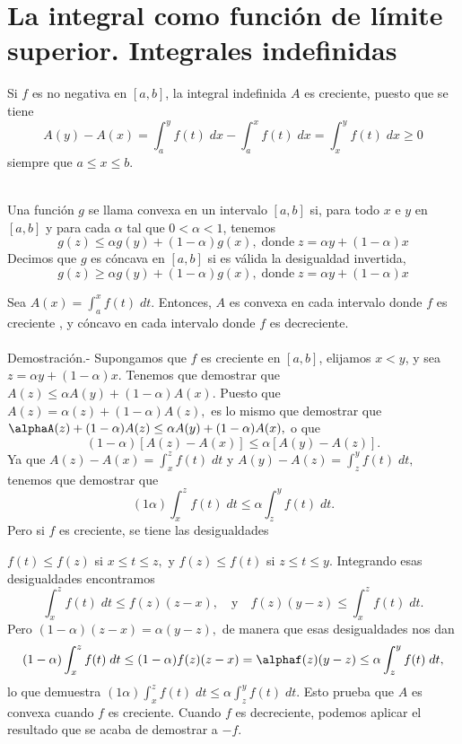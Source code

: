 \section{La integral como función de límite superior. Integrales indefinidas}

Si $f$ es no negativa en $[a,b]$, la integral indefinida $A$ es creciente, puesto que se tiene
$$A(y)-A(x)=\int_a^y f(t)\; dx - \int_a^x f(t)\; dx = \int_x^y f(t)\; dx \geq 0$$
siempre que $a\leq x \leq b.$\\\\

    \begin{def.} Una función $g$ se llama convexa en un intervalo $[a,b]$ si, para todo $x$ e $y$ en $[a,b]$ y para cada $\alpha$ tal que $0<\alpha<1$, tenemos 
	$$g(z)\leq \alpha g(y) + (1-\alpha)g(x),\; \mbox{donde}\; z=\alpha y + (1-\alpha)x$$
	Decimos que $g$ es cóncava en $[a,b]$ si es válida la desigualdad invertida,
	$$g(z)\geq \alpha g(y) + (1-\alpha)g(x),\; \mbox{donde}\; z=\alpha y + (1-\alpha)x$$
    \end{def.}

\begin{teo}
    Sea $A(x) =\int_a^x f(t)\; dt$. Entonces, $A$ es convexa en cada intervalo donde $f$ es creciente , y cóncavo en cada intervalo donde $f$ es decreciente.\\\\
    Demostración.-\; Supongamos que $f$ es creciente en $[a,b]$, elijamos $x<y$,  y sea $z=\alpha y + (1-\alpha)x.$ Tenemos que demostrar que $A(z)\leq \alpha A(y)+(1-\alpha)A(x)$.  Puesto que $A(z)=\alpha(z)+(1-\alpha)A(z),$ es lo mismo que demostrar que $\alphaA(z)+(1-\alpha)A(z)\leq \alpha A(y)+(1-\alpha)A(x),$ o que
    $$(1-\alpha)\left[A(z)-A(x)\right]\leq \alpha\left[A(y)-A(z)\right].$$
    Ya que $A(z)-A(x)=\int_x^z f(t)\; dt$ y $A(y)-A(z)=\int_z^y f(t)\; dt,$ tenemos que demostrar que 
    $$(1\alpha)\int_x^z f(t)\; dt \leq \alpha \int_z^y f(t)\; dt.$$
    Pero si $f$ es creciente, se tiene las desigualdades
    \begin{center}
    $f(t)\leq f(z)$ si $x\leq t \leq z,$ y $f(z)\leq f(t)$ si $z\leq t \leq y$.
    Integrando esas desigualdades encontramos
    $$\int_x^z f(t)\; dt \leq f(z)(z-x), \quad \mbox{y}\quad f(z)(y-z)\leq \int_x^z f(t)\; dt.$$
    Pero $(1-\alpha)(z-x)=\alpha(y-z),$ de manera que esas desigualdades nos dan
    $$(1-\alpha)\int_x^z f(t)\; dt\leq (1-\alpha)f(z)(z-x)=\alphaf(z)(y-z)\leq \alpha \int_z^y f(t)\; dt,$$
    lo que demuestra $(1\alpha)\int_x^z f(t)\; dt \leq \alpha \int_z^y f(t)\; dt$. Esto prueba que $A$ es convexa cuando $f$ es creciente. Cuando $f$ es decreciente, podemos aplicar el resultado que se acaba de demostrar a $-f$.
\end{center}
\end{teo}





